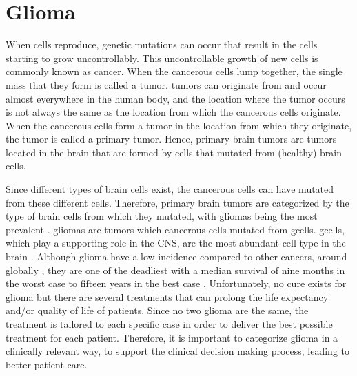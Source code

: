 \section{Glioma}

When cells reproduce, genetic mutations can occur that result in the cells starting to grow uncontrollably.
This uncontrollable growth of new cells is commonly known as cancer.
When the cancerous cells lump together, the single mass that they form is called a \gls{tumor}.
\Glspl{tumor} can originate from and occur almost everywhere in the human body, and the location where the \gls{tumor} occurs is not always the same as the location from which the cancerous cells originate.
When the cancerous cells form a \gls{tumor} in the location from which they originate, the \gls{tumor} is called a primary \gls{tumor}.
Hence, primary brain \glspl{tumor} are \glspl{tumor} located in the brain that are formed by cells that mutated from (healthy) brain cells.

Since different types of brain cells exist, the cancerous cells can have mutated from these different cells.
Therefore, primary brain \glspl{tumor} are categorized by the type of brain cells from which they mutated, with \glspl{glioma} being the most prevalent \autocite{leece2017indicence}.
\Glspl{glioma} are \glspl{tumor} which cancerous cells mutated from \glspl{gcell}.
\Glspl{gcell}, which play a supporting role in the \acrlong{CNS}, are the most abundant cell type in the brain \autocite{jakel2017glial}.
Although \gls{glioma} have a low incidence compared to other cancers, around  globally \autocite{leece2017indicence}, they are one of the deadliest with a median survival of nine months in the worst case to fifteen years in the best case \autocite{ho2014incidence, olar2015survival}.
Unfortunately, no cure exists for \gls{glioma} but there are several treatments that can prolong the life expectancy and/or quality of life of patients.
Since no two \gls{glioma} are the same, the treatment is tailored to each specific case in order to deliver the best possible treatment for each patient.
Therefore, it is important to categorize \gls{glioma} in a clinically relevant way, to support the clinical decision making process, leading to better patient care.

